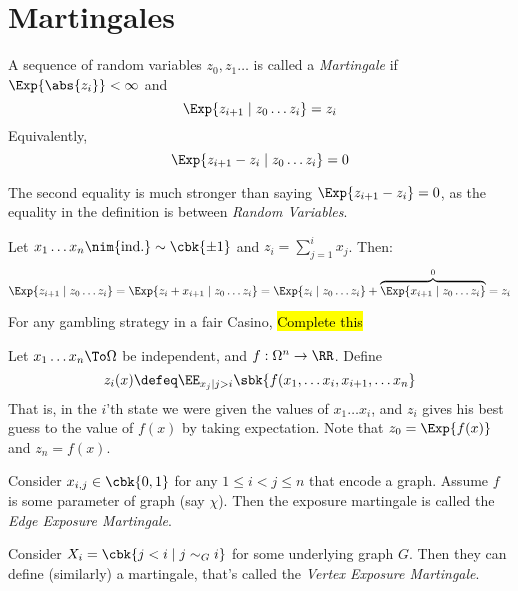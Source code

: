 \documentclass[a4paper, 11pt, oneside]{book}
\begin{document}
\section{Martingales}
\begin{yellowBox}
	\begin{defn}
		[Martingale] A sequence of random variables $z_0,z_1\ldots$ is called a \emph{Martingale} if $\Exp{\abs{z_i}}<\infty$ and
		\[
		\Exp{z_{i+1}\mid z_0\ldots z_i} = z_i
		\]
		Equivalently, 
	\[
	\Exp{z_{i+1} - z_i\mid z_0\ldots z_i} = 0
	\]
	\end{defn}
	\begin{remark}
		The second equality is much stronger than saying $\Exp{z_{i+1}-z_i} = 0$, as the equality in the definition is between \emph{Random Variables}.
	\end{remark}
\end{yellowBox}
\begin{example}
	Let $x_1\ldots x_n \nim{\text{ind.}}\sim \cbk{\pm1}$ and $z_i = \sum_{j=1}^i x_j$. Then:
	\[
	\Exp{z_{i+1}\mid z_0\ldots z_i} = \Exp{z_i + x_{i+1}\mid z_0\ldots z_i} = \Exp{z_i\mid z_0\ldots z_i} + \overbrace{\Exp{x_{i+1}\mid z_0\ldots z_i}}^0 = z_i
	\]
\end{example}
\begin{example}
	For any gambling strategy in a fair Casino, \hl{Complete this}
\end{example}
\begin{example}
	 Let $x_1\ldots x_n\To \Omega$ be independent, and $f: \Omega ^n\to \RR$. Define
	\[
	z_i(x) \defeq \EE_{x_j\mid j>i}\sbk{f(x_1,\ldots x_i,x_{i+1},\ldots x_n}
	\]
	That is, in the $i$'th state we were given the values of $x_1\ldots x_i$, and $z_i$ gives his best guess to the value of $f(x)$ by taking expectation. Note that $z_0 = \Exp{f(x)}$ and $z_n = f(x)$.
	
	Consider $x_{i,j}\in \cbk{0,1}$ for any $1\le i < j \le n$ that encode a graph. Assume $f$ is some parameter of graph (say $\chi$). Then the exposure martingale is called the \emph{Edge Exposure Martingale}. 
	
	Consider $X_i = \cbk{j<i \mid j\sim_G i}$ for some underlying graph $G$. Then they can define (similarly) a martingale, that's called the \emph{Vertex Exposure Martingale}.
\end{example}
\end{document}
